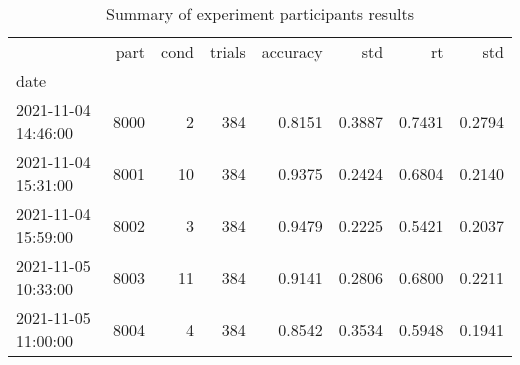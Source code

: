 \begin{table}
\centering
\caption{Summary of experiment participants results}
\label{table-subject-summary}
\begin{tabular}{lrrrrrrr}
\toprule
{} &  part & cond & trials & accuracy &    std &     rt &    std \\
date                &       &      &        &          &        &        &        \\
\midrule
2021-11-04 14:46:00 &  8000 &    2 &    384 &   0.8151 & 0.3887 & 0.7431 & 0.2794 \\
2021-11-04 15:31:00 &  8001 &   10 &    384 &   0.9375 & 0.2424 & 0.6804 & 0.2140 \\
2021-11-04 15:59:00 &  8002 &    3 &    384 &   0.9479 & 0.2225 & 0.5421 & 0.2037 \\
2021-11-05 10:33:00 &  8003 &   11 &    384 &   0.9141 & 0.2806 & 0.6800 & 0.2211 \\
2021-11-05 11:00:00 &  8004 &    4 &    384 &   0.8542 & 0.3534 & 0.5948 & 0.1941 \\
\bottomrule
\end{tabular}
\end{table}
